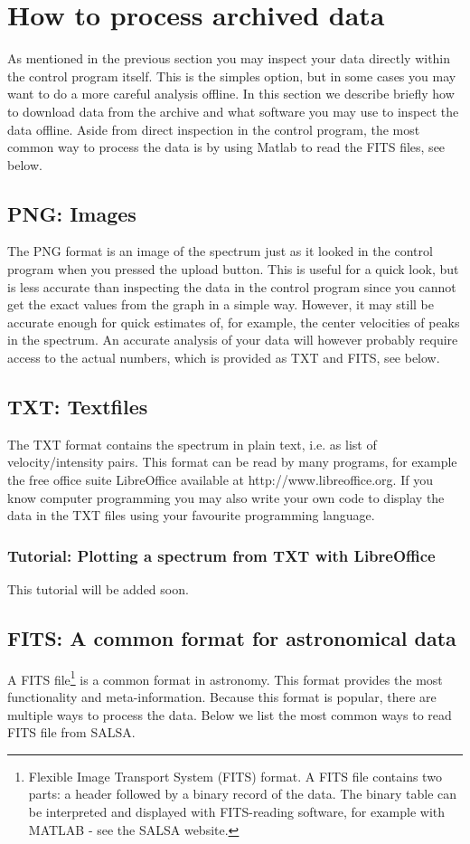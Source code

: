 \section{How to process archived data}
\label{sect:archiveprocess}
As mentioned in the previous section you may inspect your data directly within
the control program itself. This is the simples option, but in some cases you
may want to do a more careful analysis offline. In this section we describe
briefly how to download data from the archive and what software you may use to
inspect the data offline. Aside from direct inspection in the control program,
the most common way to process the data is by using Matlab to read the FITS
files, see below.

\subsection{PNG: Images}
The PNG format is an image of the spectrum just as it looked in the control
program when you pressed the upload button. This is useful for a quick look,
but is less accurate than inspecting the data in the control program since you
cannot get the exact values from the graph in a simple way. However, it may
still be accurate enough for quick estimates of, for example, the center
velocities of peaks in the spectrum. An accurate analysis of your data will
however probably require access to the actual numbers, which is provided
as TXT and FITS, see below.

\subsection{TXT: Textfiles}
The TXT format contains the spectrum in plain text, i.e. as list of
velocity/intensity pairs. This format can be read by many programs, for example
the free office suite LibreOffice available at http://www.libreoffice.org.  If
you know computer programming you may also write your own code to display the
data in the TXT files using your favourite programming language.
\subsubsection{Tutorial: Plotting a spectrum from TXT with LibreOffice}
This tutorial will be added soon.

\subsection{FITS: A common format for astronomical data}
A FITS file\footnote{Flexible Image Transport System (FITS) format.  A FITS
file contains two parts: a header followed by a binary record of the data.  The
binary table can be interpreted and displayed with FITS-reading software, for
example with MATLAB - see the SALSA website.} is a common format in astronomy.
This format provides the most functionality and meta-information. Because this 
format is popular, there are multiple ways to process the data. Below we list
the most common ways to read FITS file from SALSA.

